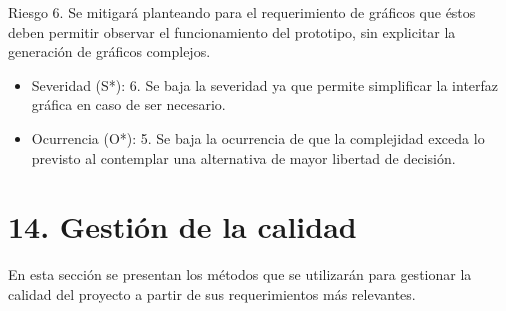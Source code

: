 \documentclass[
11pt, %
]{charter}
\begin{document}
Riesgo 6. Se mitigará planteando para el requerimiento de gráficos que éstos deben permitir observar el funcionamiento del prototipo, sin explicitar la generación de gráficos complejos.	
\begin{itemize}
	\item Severidad (S*): 6. Se baja la severidad ya que permite simplificar la interfaz gráfica en caso de ser necesario.
	\item Ocurrencia (O*): 5. Se baja la ocurrencia de que la complejidad exceda lo previsto al contemplar una alternativa de mayor libertad de decisión. 
\end{itemize}



\section{14. Gestión de la calidad}
\label{sec:calidad}

En esta sección se presentan los métodos que se utilizarán para gestionar la calidad del proyecto a partir de sus requerimientos más relevantes.
\end{document}
